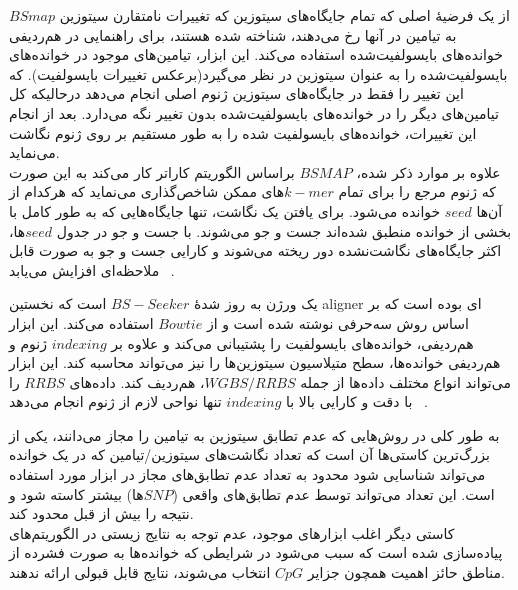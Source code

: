 $BSmap$ از یک فرضیهٔ اصلی که تمام جایگاه‌های سیتوزین‌ که تغییرات نامتقارن سیتوزین به تیامین در آنها رخ می‌دهند، شناخته شده هستند، برای راهنمایی در هم‌ردیفی خوانده‌های بایسولفیت‌شده استفاده می‌کند. این ابزار، تیامین‌های موجود در خوانده‌های بایسولفیت‌شده را به عنوان سیتوزین‌ در نظر می‌گیرد(برعکس تغییرات بایسولفیت). که این تغییر را فقط در جایگاه‌های سیتوزین‌ ژنوم اصلی انجام می‌دهد درحالیکه کل تیامین‌های دیگر را در خوانده‌های بایسولفیت‌شده بدون تغییر نگه می‌دارد. بعد از انجام این تغییرات، خوانده‌های بایسولفیت شده را به طور مستقیم بر روی ژنوم نگاشت می‌نماید.\\
علاوه بر موارد ذکر شده، $BSMAP$ براساس الگوریتم کارا‌تر  کار می‌کند به این صورت که ژنوم مرجع را برای تمام $k-mer$های  ممکن شاخص‌گذاری می‌نماید که هرکدام از آن‌ها $seed$ خوانده می‌شود. برای یافتن یک نگاشت، تنها جایگاه‌هایی که به طور کامل با بخشی از خوانده منطبق شده‌اند جست و جو می‌شوند. با جست و جو در جدول $seed$ها، اکثر جایگاه‌های نگاشت‌نشده دور ریخته می‌شوند و کارایی جست و جو به صورت قابل ملاحظه‌ای افزایش می‌یابد
~\cite{xi2009bsmap}.


 یک ورژن به روز شدهٔ $BS-Seeker$ است که نخستین aligner ای بوده است که بر اساس روش سه‌حرفی نوشته شده است و از $Bowtie$ استفاده می‌کند. این ابزار هم‌ردیفی، خوانده‌های بایسولفیت را پشتیبانی می‌کند و علاوه بر $indexing$ ژنوم و هم‌ردیفی خوانده‌ها، سطح متیلاسیون سیتوزین‌ها را نیز می‌تواند محاسبه کند. این ابزار می‌تواند انواع مختلف داده‌ها از جمله $WGBS/RRBS$، هم‌ردیف کند.  داده‌های $RRBS$ را با دقت و کارایی بالا با $indexing$ تنها نواحی لازم از ژنوم انجام ‌می‌دهد
~\cite{guo2013bs}.



به طور کلی در روش‌هایی که عدم تطابق سیتوزین به تیامین را مجاز می‌دانند، یکی از بزرگ‌ترین کاستی‌ها آن است که تعداد نگاشت‌های سیتوزین/تیامین که در یک خوانده می‌تواند شناسایی شود محدود به تعداد عدم تطابق‌های مجاز در ابزار مورد استفاده است. این تعداد می‌تواند توسط عدم تطابق‌های واقعی ($SNP$ها) بیشتر کاسته شود و نتیجه را بیش از قبل محدود کند.\\
کاستی دیگر اغلب ابزارهای موجود، عدم توجه به نتایج زیستی در الگوریتم‌های پیاده‌سازی شده است که سبب می‌شود در شرایطی که خوانده‌ها به صورت فشرده از مناطق حائز اهمیت همچون جزایر $CpG$ انتخاب می‌شوند، نتایج قابل قبولی ارائه ندهند.


